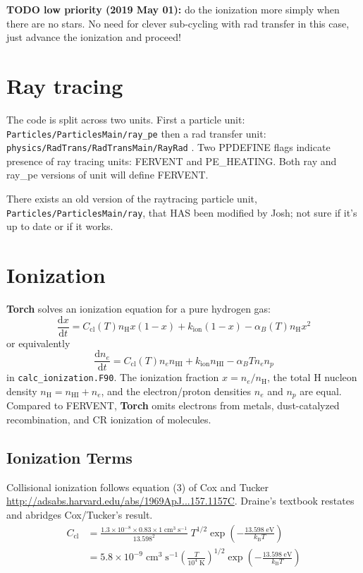 \documentclass[10pt]{article}
\newcommand*{\mt}{\mathrm}
\newcommand*{\unit}[1]{\;\mt{#1}}  %
\newcommand*{\dtl}{\mathrm{d}}
\newcommand*{\kB}{k_\mathrm{B}}
\begin{document}
\textbf{TODO low priority (2019 May 01):} do the ionization more simply when
there are no stars.  No need for clever sub-cycling with rad transfer in this
case, just advance the ionization and proceed!

\section{Ray tracing}

The code is split across two units.  First a particle unit:
\texttt{Particles/ParticlesMain/ray\_pe}
then a rad transfer unit:
\texttt{physics/RadTrans/RadTransMain/RayRad} .
Two PPDEFINE flags indicate presence of ray tracing units:
FERVENT and PE\_HEATING.  Both ray and ray\_pe versions of unit will define
FERVENT.

There exists an old version of the raytracing particle unit,
\texttt{Particles/ParticlesMain/ray}, that HAS been modified by Josh; not sure
if it's up to date or if it works.


\section{Ionization}

\textbf{Torch} solves an ionization equation for a pure hydrogen gas:
\begin{equation}
    \frac{\dtl x}{\dtl t}
    = C_\mt{cl}(T) n_\mt{H} x (1-x) + k_\mt{ion} (1-x) - \alpha_B(T) n_\mt{H} x^2
\end{equation}
or equivalently
\[
    \frac{\dtl n_e}{\dtl t}
    = C_\mt{cl}(T) n_e n_\mt{HI} + k_\mt{ion} n_\mt{HI} - \alpha_B{T} n_e n_p
\]
in \texttt{calc\_ionization.F90}.
The ionization fraction $x = n_e/n_\mt{H}$, the total H nucleon density
$n_\mt{H} = n_\mt{HI} + n_e$, and the electron/proton densities $n_e$ and $n_p$
are equal.  Compared to FERVENT, \textbf{Torch} omits electrons from metals,
dust-catalyzed recombination, and CR ionization of molecules.

\subsection{Ionization Terms}

Collisional ionization follows equation (3) of Cox and Tucker
\href{1969ApJ...157.1157C}{http://adsabs.harvard.edu/abs/1969ApJ...157.1157C}.
Draine's textbook restates and abridges Cox/Tucker's result.
\begin{align}
    C_\mt{cl}
    &= \frac{1.3 \times 10^{-8} \times 0.83 \times 1 \unit{cm^{3}\;s^{-1}}}{13.598^2}
    \;
    T^{1/2} \exp \left( - \frac{13.598 \unit{eV}}{\kB T}\right) \\
    &= 5.8 \times 10^{-9} \unit{cm^{3}\;s^{-1}}
    \left(\frac{T}{10^4\unit{K}}\right)^{1/2} \exp \left( - \frac{13.598 \unit{eV}}{\kB T}\right)
\end{align}
\end{document}
